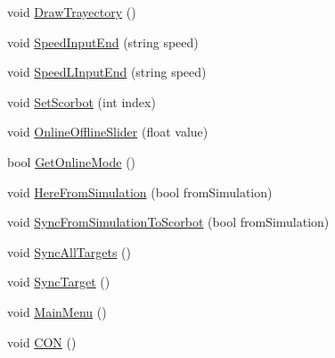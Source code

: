 \begin{DoxyCompactItemize}
void \mbox{\hyperlink{class_game_controller_afd55aa0db0046a73a2b9bb57dc56d373}{Draw\+Trayectory}} ()
\item 
void \mbox{\hyperlink{class_game_controller_a7a993b5ee6e6376f81670d3958d48bb6}{Speed\+Input\+End}} (string speed)
\item 
void \mbox{\hyperlink{class_game_controller_aa10e8ec20019adfd8f3c2dfbea4ff8bc}{Speed\+L\+Input\+End}} (string speed)
\item 
void \mbox{\hyperlink{class_game_controller_aa448386fb4d83ff0ca9211424ad6b020}{Set\+Scorbot}} (int index)
\item 
void \mbox{\hyperlink{class_game_controller_a48800115bee7dd138485ca7cd1464f78}{Online\+Offline\+Slider}} (float value)
\item 
bool \mbox{\hyperlink{class_game_controller_ab8bc597c4e47a3cece068762cdfaf33a}{Get\+Online\+Mode}} ()
\item 
void \mbox{\hyperlink{class_game_controller_a6ac352c2a0b3dafb1da0a71fb047736e}{Here\+From\+Simulation}} (bool from\+Simulation)
\item 
void \mbox{\hyperlink{class_game_controller_a3e908f52a48528254dddc0f4f4a9d9f8}{Sync\+From\+Simulation\+To\+Scorbot}} (bool from\+Simulation)
\item 
void \mbox{\hyperlink{class_game_controller_ab42ee9c1c07fc60cb506b769bd6047c9}{Sync\+All\+Targets}} ()
\item 
void \mbox{\hyperlink{class_game_controller_afb0be280e9e68853555db2ef42337bd9}{Sync\+Target}} ()
\item 
void \mbox{\hyperlink{class_game_controller_aae26868d4e9c6e735d5fef9cc7b15bb1}{Main\+Menu}} ()
\item 
void \mbox{\hyperlink{class_game_controller_ae9fc70a12ad70871780529854ea12d9c}{C\+ON}} ()
\end{DoxyCompactItemize}
